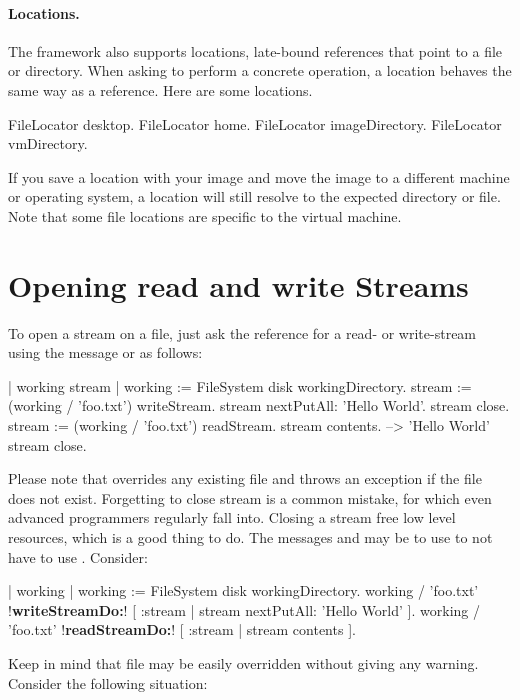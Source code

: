 \documentclass[a4paper,10pt,twoside]{book}
\begin{document}
\paragraph{Locations.}
The framework also supports locations, late-bound references that point to a file or directory. When asking to perform a concrete operation, a location behaves the same way as a reference. Here are some  locations.

\begin{code}{}
FileLocator desktop.
FileLocator home.
FileLocator imageDirectory.
FileLocator vmDirectory.
\end{code} 

If you save a location with your image and move the image to a different machine or operating system, a location will still resolve to the expected directory or file. Note that some file locations are specific to the virtual machine.

\section{Opening read and write Streams}
To open a stream on a file, just ask the reference for a read- or write-stream using the message  or  as follows:

\begin{code}{}
| working stream |
working := FileSystem disk workingDirectory.
stream := (working / 'foo.txt') writeStream.
stream nextPutAll: 'Hello World'.
stream close.
stream := (working / 'foo.txt') readStream.
stream contents.			--> 'Hello World'
stream close.
\end{code}

Please note that  overrides any existing file and  throws an exception if the file does not exist. Forgetting to close stream is a common mistake, for which even advanced programmers regularly fall into. Closing a stream free low level resources, which is a good thing to do. The messages  and  may be to use to not have to use . Consider:

\begin{code}{}
| working  |
working := FileSystem disk workingDirectory.
working / 'foo.txt' !\textbf{writeStreamDo:}! [ :stream | stream nextPutAll: 'Hello World' ].
working / 'foo.txt' !\textbf{readStreamDo:}! [ :stream | stream contents ].
\end{code}

Keep in mind that file may be easily overridden without giving any warning. Consider the following situation:
\end{document}
